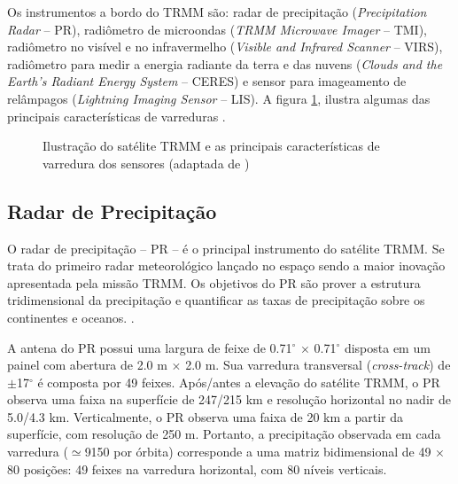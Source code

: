 Os instrumentos a bordo do TRMM são: radar de precipitação (\textit{Precipitation Radar} -- PR), radiômetro de microondas (\textit{TRMM Microwave Imager} -- TMI), radiômetro no visível e no infravermelho (\textit{Visible and Infrared Scanner} -- VIRS), radiômetro para medir a energia radiante da terra e das nuvens (\textit{Clouds and the Earth's Radiant Energy System} -- CERES) e sensor para imageamento de relâmpagos (\textit{Lightning Imaging Sensor} -- LIS). A figura \ref{figtrmm}, ilustra algumas das principais características de varreduras \cite{kummerok1998}.

\begin{figure}[!hb]
\caption{Ilustração do satélite TRMM e as  principais características de varredura dos sensores (adaptada de )}
\label{figtrmm} 
\end{figure} 


\subsection{Radar de Precipitação}

O radar de precipitação -- PR -- é o principal instrumento do satélite TRMM. Se trata do primeiro radar meteorológico lançado no espaço sendo a maior inovação apresentada pela missão TRMM. Os objetivos do PR são prover a estrutura tridimensional da precipitação e quantificar as taxas de precipitação sobre os continentes e oceanos.  \cite{kummerok1998}. 



A antena do PR possui uma largura de feixe de 0.71$^{\circ}$ $\times$ 0.71$^{\circ}$ disposta em um painel com abertura de 2.0 m $\times$ 2.0 m. Sua varredura transversal (\textit{cross-track}) de $\pm$17$^{\circ}$ é composta por 49 feixes. Após/antes a elevação do satélite TRMM, o PR observa uma faixa na superfície de 247/215 km e resolução horizontal no nadir de 5.0/4.3 km. Verticalmente, o PR observa uma faixa de 20 km a partir da superfície, com resolução de 250 m. Portanto, a precipitação observada em cada varredura ($\simeq$9150 por órbita) corresponde a uma matriz bidimensional de 49 $\times$ 80 posições: 49 feixes na varredura horizontal, com 80 níveis verticais. 


